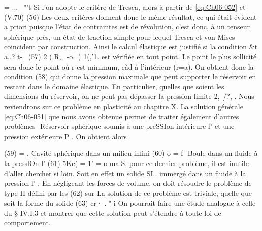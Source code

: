 = 
...~ "'t 
Si l'on adopte le critère de Tresca, alors à partir de \eqref{eq:Ch06-052} et (V.70) 
(56) 
Les deux critères donnent donc le même résultat, ce qui était évident a priori puisque l'état de contraintes est de révolution, c'est donc, à un tenseur sphérique près, un état de traction simple pour lequel Tresca et von Mises coincident par construction. Ainsi le calcul élastique est justifié si la con­dition 
&t a..? t-~
(57) 
2 (.R,.~-o.~) 1(,'1. 
est vérifiée en tout point. Le point le plus sollicité sera donc le point où r est minimum, càd à l'intérieur (r=a). On obtient donc la condition 
(58) 
qui donne la pression maximale que peut supporter le réservoir en restant dans le domaine élastique. En particulier, quelles que soient les dimensions du réservoir, on ne peut pas dépasser la pression limite 2,~/?, . Nous re­viendrons sur ce problème en plasticité au chapitre X. 
La solution générale \eqref{eq:Ch06-051} que nous avons obtenue permet de traiter 
également d'autres problèmes 
 Réservoir sphérique soumis à une preSSIon intérieure f' et une pression 
extérieure P . On obtient alors 

(59) 
= 
, Cavité sphérique dans un milieu infini 
(60) o
= f 
 Boule dans un fluide à la presslOn l' 
(61) 5Kc( =-1' = o 
malS, pour ce dernier problème, il est inutile d'aller chercher si loin. Soit 
en effet un solide SI.. immergé dans un fluide à la pression l' . En négligeant les forces de volume, on doit résoudre le problème de type II défini par les 
(62) sur 
La solution de ce problème est triviale, quelle que soit la forme du solide 
(63) cr· .
"-i 
On pourrait faire une étude analogue à celle du § IV.I.3 et montrer que cette 
solution peut s'étendre à toute loi de comportement. 
